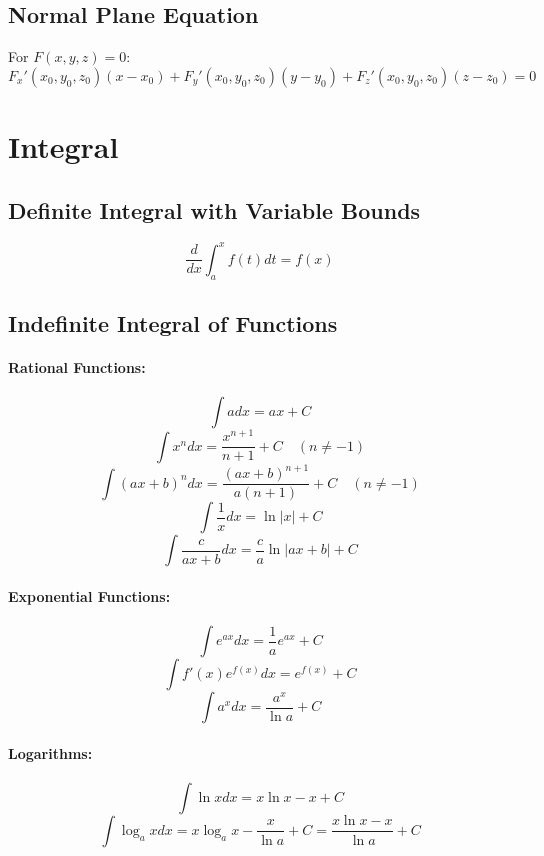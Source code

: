 \documentclass{article}
\begin{document}
\subsection{Normal Plane Equation}
For $F(x, y, z) = 0$:
\[
    F_x'(x_0, y_0, z_0)(x - x_0) + F_y'(x_0, y_0, z_0)(y - y_0) + F_z'(x_0, y_0, z_0)(z - z_0) = 0
\]


\newpage
\section{Integral}

\subsection{Definite Integral with Variable Bounds}

\[
    \frac{d}{dx} \int_a^x f(t) dt = f(x)
\]

\subsection{Indefinite Integral of Functions}

\paragraph{Rational Functions:}
\[
    \int a dx = ax + C
\]
\[
    \int x^n dx = \frac{x^{n+1}}{n+1} + C \quad (n \neq -1)
\]
\[
    \int (ax + b)^n dx = \frac{(ax + b)^{n+1}}{a(n+1)} + C \quad (n \neq -1)
\]
\[
    \int \frac{1}{x} dx = \ln|x| + C
\]
\[
    \int \frac{c}{ax + b} dx = \frac{c}{a} \ln|ax + b| + C
\]
\paragraph{Exponential Functions:}
\[
    \int e^{ax} dx = \frac{1}{a} e^{ax} + C
\]
\[
    \int f'(x) e^{f(x)} dx = e^{f(x)} + C
\]
\[
    \int a^x dx = \frac{a^x}{\ln a} + C
\]
\paragraph{Logarithms:}
\[
    \int \ln x dx = x \ln x - x + C
\]
\[
    \int \log_a x dx = x \log_a x - \frac{x}{\ln a} + C = \frac{x \ln x - x}{\ln a} + C
\]
\end{document}
